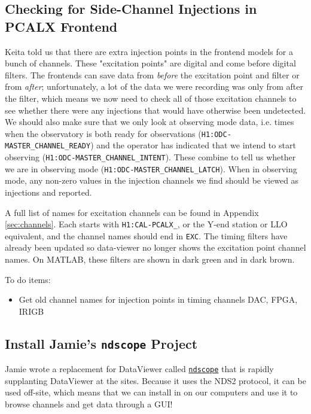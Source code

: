\documentclass{article}
\newcommand*{\TODO}{\textcolor{todo}}
\begin{document}
\TODO{\subsection{Checking for Side-Channel Injections in PCALX Frontend}
}

Keita told us that there are extra injection points in the frontend models for a bunch of channels. These "excitation points" are digital and come before digital filters. The frontends can save data from \textit{before} the excitation point and filter or from \textit{after}; unfortunately, a lot of the data we were recording was only from after the filter, which means we now need to check all of those excitation channels to see whether there were any injections that would have otherwise been undetected. We should also make sure that we only look at observing mode data, i.e. times when the observatory is both ready for observations (\texttt{H1:ODC-MASTER\_CHANNEL\_READY}) and the operator has indicated that we intend to start observing (\texttt{H1:ODC-MASTER\_CHANNEL\_INTENT}). These combine to tell us whether we are in observing mode (\texttt{H1:ODC-MASTER\_CHANNEL\_LATCH}). When in observing mode, any non-zero values in the injection channels we find should be viewed as injections and reported.

A full list of names for excitation channels can be found in Appendix \ref{sec:channels}. Each starts with \texttt{H1:CAL-PCALX\_}, or the Y-end station or LLO equivalent, and the channel names should end in \texttt{EXC}. The timing filters have already been updated so data-viewer no longer shows the excitation point channel names. On MATLAB, these filters are shown in dark green and in dark brown.

To do items:
\begin{itemize}
    \item \TODO{Get old channel names for injection points in timing channels DAC, FPGA, IRIGB}
\end{itemize}

\subsection{Install Jamie's \texttt{ndscope} Project}

Jamie wrote a replacement for DataViewer called \href{https://git.ligo.org/cds/ndscope}{\texttt{ndscope}} that is rapidly supplanting DataViewer at the sites. Because it uses the NDS2 protocol, it can be used off-site, which means that we can install in on our computers and use it to browse channels and get data through a GUI!
\end{document}
